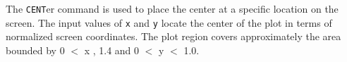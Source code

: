 \headb

The {\tt CENT}er command is used to place the center at a specific
location on the screen.  The input values of {\tt x} and {\tt y} locate
the center of the plot in terms of normalized screen coordinates.  The
plot region covers approximately the area bounded by
0 $<$  x , 1.4 and 0 $<$ y $<$ 1.0.
\vfill
\eject
